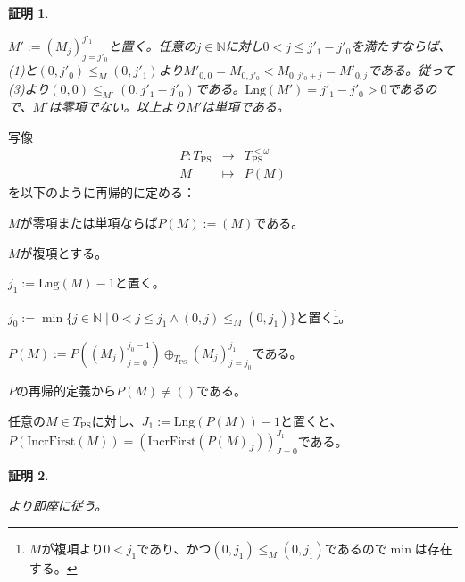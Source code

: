 \documentclass[dvipdfmx,uplatex]{jsarticle}
\theoremstyle{customnonumberbreakfortheorem}
\theoremstyle{customnonumberbreakforproof}
\newtheorem{hideableproof}{証明}
\begin{document}
\begin{hideableproof}
	\begin{indented}
		\item \(M' := (M_j)_{j=j'_0}^{j'_1}\)と置く。任意の\(j \in \mathbb{N}\)に対し\(0 < j \leq j'_1-j'_0\)を満たすならば、 (1)と\((0,j'_0) \leq_M (0,j'_1)\)より\(M'_{0,0} = M_{0,j'_0} < M_{0,j'_0+j} = M'_{0,j}\)である。従って (3)より\((0,0) \leq_{M'} (0,j'_1-j'_0)\)である。\(\textrm{Lng}(M') = j'_1 - j'_0 > 0\)であるので、\(M'\)は零項でない。以上より\(M'\)は単項である。
	\end{indented}
\end{hideableproof}

写像
\begin{eqnarray*}
P \colon T_{\textrm{PS}} & \to & T_{\textrm{PS}}^{< \omega} \\
M & \mapsto & P(M)
\end{eqnarray*}
を以下のように再帰的に定める：
\begin{nenumerate}
	\item \(M\)が零項または単項ならば\(P(M) := (M)\)である。
	\item \(M\)が複項とする。
	\begin{nenumerate}
		\item \(j_1 := \textrm{Lng}(M) - 1\)と置く。
		\item \(j_0 := \min \{j \in \mathbb{N} \mid 0 < j \leq j_1 \wedge (0,j) \leq_M (0,j_1)\}\)と置く\footnote{\(M\)が複項より\(0 < j_1\)であり、かつ\((0,j_1) \leq_M (0,j_1)\)であるので\(\min\)は存在する。}。
		\item \(P(M) := P((M_j)_{j=0}^{j_0-1}) \oplus_{T_{\textrm{PS}}} (M_j)_{j=j_0}^{j_1}\)である。
	\end{nenumerate}
\end{nenumerate}

\(P\)の再帰的定義から\(P(M) \neq ()\)である。

\begin{proposition}\label{PのIncrFirst同変性}
	任意の\(M \in T_{\textrm{PS}}\)に対し、\(J_1 := \textrm{Lng}(P(M))-1\)と置くと、\(P(\textrm{IncrFirst}(M)) = (\textrm{IncrFirst}(P(M)_J))_{J=0}^{J_1}\)である。
\end{proposition}

\begin{hideableproof}
	\begin{indented}
		\item {}より即座に従う。
	\end{indented}
\end{hideableproof}
\end{document}
